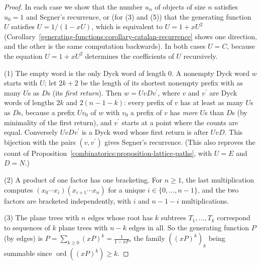 \begin{proof}
In each case we show that the number $u_n$ of objects of size $n$ satisfies $u_0 = 1$ and Segner's recurrence, or (for (3) and (5)) that the generating function $U$ satisfies $U = 1/(1 - xU)$, which is
equivalent to $U = 1 + xU^2$ (Corollary~\ref{generating-functions:corollary-catalan-recurrence} shows one direction, and the other is the same computation backwards). In both cases $U = C$, because the
equation $U = 1 + xU^2$ determines the coefficients of $U$ recursively.

(1) The empty word is the only Dyck word of length $0$. A nonempty Dyck word $w$ starts with $U$; let $2k + 2$ be the length of its shortest nonempty prefix with as many $U$s as $D$s (its \emph{first
return}). Then $w = UvDv^{\prime}$, where $v$ and $v^{\prime}$ are Dyck words of lengths $2k$ and $2(n - 1 - k)$: every prefix of $v$ has at least as many $U$s as $D$s, because a prefix $Uv_0$ of
$w$ with $v_0$ a prefix of $v$ has \emph{more} $U$s than $D$s (by minimality of the first return), and $v^{\prime}$ starts at a point where the counts are equal. Conversely $UvDv^{\prime}$ is a Dyck word
whose first return is after $UvD$. This bijection with the pairs $(v, v^{\prime})$ gives Segner's recurrence. (This also reproves the count of
Proposition~\ref{combinatorics:proposition-lattice-paths}, with $U = E$ and $D = N$.)

(2) A product of one factor has one bracketing. For $n \geq 1$, the last multiplication computes $(x_0 \cdots x_i)(x_{i+1} \cdots x_n)$ for a unique $i \in \{0, \ldots, n - 1\}$, and the two factors are
bracketed independently, with $i$ and $n - 1 - i$ multiplications.

(3) The plane trees with $n$ edges whose root has $k$ subtrees $T_1, \ldots, T_k$ correspond to sequences of $k$ plane trees with $n - k$ edges in all. So the generating function $P$ (by edges) is
$P = \sum_{k \geq 0}(xP)^k = \frac{1}{1 - xP}$, the family $((xP)^k)_k$ being summable since $\operatorname{ord}((xP)^k) \geq k$.


\end{proof}
